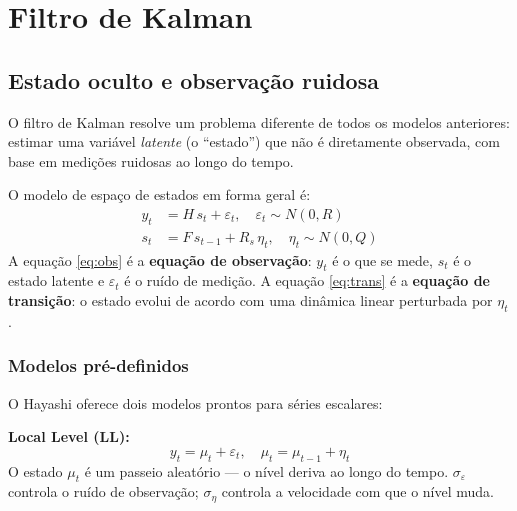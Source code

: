 \chapter{Filtro de Kalman}
\label{cap:kalman}

\section{Estado oculto e observação ruidosa}

O filtro de Kalman resolve um problema diferente de todos os modelos anteriores:
estimar uma variável \emph{latente} (o ``estado'') que não é diretamente
observada, com base em medições ruidosas ao longo do tempo.

O modelo de espaço de estados em forma geral é:
\begin{align}
  y_t   &= H\, s_t + \varepsilon_t, \quad \varepsilon_t \sim N(0, R) \label{eq:obs}\\
  s_t   &= F\, s_{t-1} + R_s\, \eta_t, \quad \eta_t \sim N(0, Q) \label{eq:trans}
\end{align}
A equação \eqref{eq:obs} é a \textbf{equação de observação}: $y_t$ é o que se
mede, $s_t$ é o estado latente e $\varepsilon_t$ é o ruído de medição. A
equação \eqref{eq:trans} é a \textbf{equação de transição}: o estado evolui
de acordo com uma dinâmica linear perturbada por $\eta_t$.

\subsection*{Modelos pré-definidos}

O Hayashi oferece dois modelos prontos para séries escalares:

\medskip
\textbf{Local Level (LL):}
\[
  y_t = \mu_t + \varepsilon_t, \quad
  \mu_t = \mu_{t-1} + \eta_t
\]
O estado $\mu_t$ é um passeio aleatório — o nível deriva ao longo do tempo.
$\sigma_\varepsilon$ controla o ruído de observação; $\sigma_\eta$ controla
a velocidade com que o nível muda.

